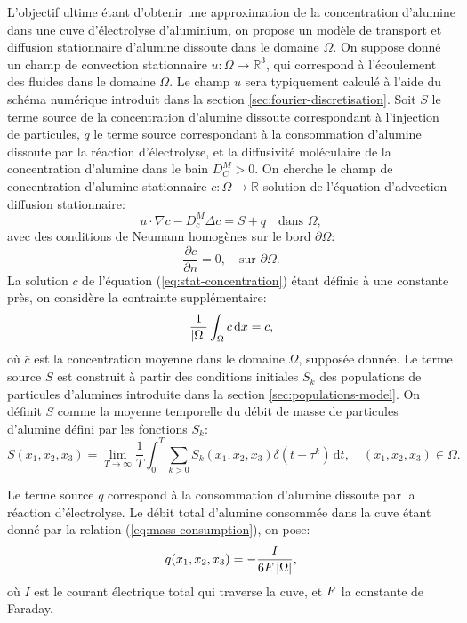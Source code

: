 L'objectif ultime étant d'obtenir une approximation de la
concentration d'alumine dans une cuve d'électrolyse d'aluminium, on propose un modèle de
transport et diffusion stationnaire d'alumine dissoute dans le domaine
$\Omega$.  On suppose donné un champ de convection stationnaire
$u:\Omega\to\mathbb R^3$, qui correspond à l'écoulement des fluides
dans le domaine $\Omega$. Le champ $u$ sera typiquement calculé à
l'aide du schéma numérique introduit dans la section
\ref{sec:fourier-discretisation}.  Soit $S$ le terme source de la
concentration d'alumine dissoute correspondant à l'injection de
particules, $q$ le terme source correspondant à la consommation
d'alumine dissoute par la réaction d'électrolyse, et la diffusivité
moléculaire de la concentration d'alumine dans le bain $D_C^M > 0$.
On cherche le champ de concentration d'alumine stationnaire
$c:\Omega\to\mathbb R$ solution de l'équation d'advection-diffusion
stationnaire:
\begin{equation}\label{eq:stat-concentration}
  u\cdot \nabla c - D_c^M \Delta c = S + q\quad \text{dans } \Omega,
\end{equation}
avec des conditions de Neumann homogènes sur le bord $\partial
\Omega$:
\begin{equation}
  \frac{\partial c}{\partial n} = 0,\quad\text{sur } \partial \Omega.
\end{equation}
La solution $c$ de l'équation (\ref{eq:stat-concentration}) étant
définie à une constante près, on considère la contrainte
supplémentaire:
\begin{equation}\label{eq:stat-alumina-avg-c}
  \frac{1}{\left\lvert \Omega \right\rvert}\int_\Omega c\,\mathrm dx = \bar c,
\end{equation}
où $\bar c$ est la concentration moyenne dans le domaine $\Omega$,
supposée donnée.
Le terme source $S$ est construit à partir des conditions initiales
$S_k$ des populations de particules d'alumines introduite dans la
section \ref{sec:populations-model}. On définit $S$ comme la moyenne
temporelle du débit de masse de particules d'alumine défini par
les fonctions $S_k$:
\begin{equation}
  S(x_1,x_2,x_3) = \lim_{T\to\infty}\frac{1}{T}\int_0^T \sum_{k>0}
  S_k(x_1, x_2, x_3) \delta(t - \tau^k)\,\mathrm dt, \quad (x_1, x_2, x_3)\in\Omega.
\end{equation}

Le terme source $q$ correspond à la consommation d'alumine
dissoute par la réaction d'électrolyse. Le débit total d'alumine
consommée dans la cuve étant donné par la relation
(\ref{eq:mass-consumption}), on pose:
\begin{equation}\label{eq:stat-alumina-consommation}
  q(x_1, x_2, x_3) = -\frac{I}{6F\left\lvert \Omega \right\rvert},
\end{equation}
où $I$ est le courant électrique total qui traverse la cuve, et
$F$ la constante de Faraday.

